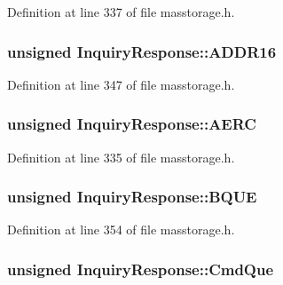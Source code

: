 \-Definition at line 337 of file masstorage.\-h.

\hypertarget{struct_inquiry_response_ada87cc4b574b2d9dcce27c6837ee09a3}{
\subsubsection[{\-A\-D\-D\-R16}]{\setlength{\rightskip}{0pt plus 5cm}unsigned {\bf \-Inquiry\-Response\-::\-A\-D\-D\-R16}}}\label{struct_inquiry_response_ada87cc4b574b2d9dcce27c6837ee09a3}


\-Definition at line 347 of file masstorage.\-h.

\hypertarget{struct_inquiry_response_ad02da835cba8057f07b359903ee0c389}{
\subsubsection[{\-A\-E\-R\-C}]{\setlength{\rightskip}{0pt plus 5cm}unsigned {\bf \-Inquiry\-Response\-::\-A\-E\-R\-C}}}\label{struct_inquiry_response_ad02da835cba8057f07b359903ee0c389}


\-Definition at line 335 of file masstorage.\-h.

\hypertarget{struct_inquiry_response_af735c28637c0ebc8f3e8a04f7b3023cc}{
\subsubsection[{\-B\-Q\-U\-E}]{\setlength{\rightskip}{0pt plus 5cm}unsigned {\bf \-Inquiry\-Response\-::\-B\-Q\-U\-E}}}\label{struct_inquiry_response_af735c28637c0ebc8f3e8a04f7b3023cc}


\-Definition at line 354 of file masstorage.\-h.

\hypertarget{struct_inquiry_response_a335e2997167a36347d717e1ed997f9be}{
\subsubsection[{\-Cmd\-Que}]{\setlength{\rightskip}{0pt plus 5cm}unsigned {\bf \-Inquiry\-Response\-::\-Cmd\-Que}}}\label{struct_inquiry_response_a335e2997167a36347d717e1ed997f9be}


